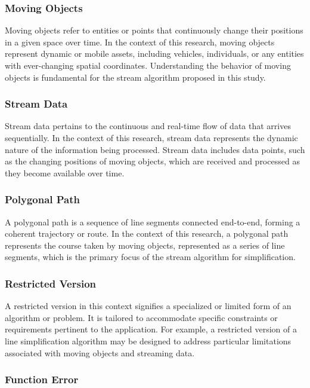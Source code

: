 \subsubsection{Moving Objects}

Moving objects refer to entities or points that continuously change their positions in a given space over time. In the context of this research, moving objects represent dynamic or mobile assets, including vehicles, individuals, or any entities with ever-changing spatial coordinates. Understanding the behavior of moving objects is fundamental for the stream algorithm proposed in this study.

\subsubsection{Stream Data}

Stream data pertains to the continuous and real-time flow of data that arrives sequentially. In the context of this research, stream data represents the dynamic nature of the information being processed. Stream data includes data points, such as the changing positions of moving objects, which are received and processed as they become available over time.


\subsubsection{Polygonal Path}

A polygonal path is a sequence of line segments connected end-to-end, forming a coherent trajectory or route. In the context of this research, a polygonal path represents the course taken by moving objects, represented as a series of line segments, which is the primary focus of the stream algorithm for simplification.


\subsubsection{Restricted Version}

A restricted version in this context signifies a specialized or limited form of an algorithm or problem. It is tailored to accommodate specific constraints or requirements pertinent to the application. For example, a restricted version of a line simplification algorithm may be designed to address particular limitations associated with moving objects and streaming data.



\subsubsection{Function Error}

